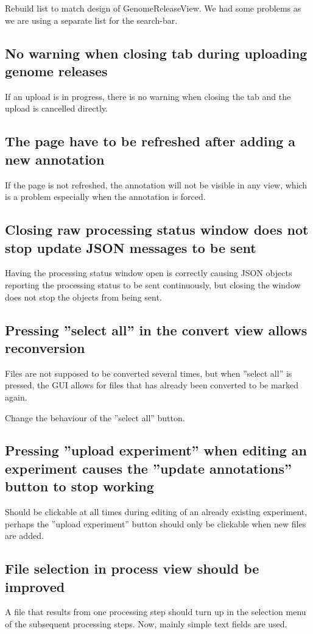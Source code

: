 Rebuild list to match design of GenomeReleaseView. We had some problems as we are using a separate list for the search-bar.

\subsection{No warning when closing tab during uploading genome releases}
If an upload is in progress, there is no warning when closing the tab and the upload is cancelled directly.

\subsection{The page have to be refreshed after adding a new annotation}
If the page is not refreshed, the annotation will not be visible in any view,
which is a problem especially when the annotation is forced.

\subsection{Closing raw processing status window does not stop update JSON messages to be sent}
Having the processing status window open is correctly causing JSON objects
reporting the processing status to be sent continuously, but closing the
window does not stop the objects from being sent. 

\subsection{Pressing ''select all'' in the convert view allows reconversion}
Files are not supposed to be converted several times, but when ''select all''
is pressed, the GUI allows for files that has already been converted to be
marked again.

Change the behaviour of the ''select all'' button.

\subsection{Pressing ''upload experiment'' when editing an experiment causes
the ''update annotations'' button to stop working}
Should be clickable at all times during editing of an already existing 
experiment, perhaps the ''upload experiment'' button should only be clickable
when new files are added.

\subsection{File selection in process view should be improved}
A file that results from one processing step should turn up in the selection
menu of the subsequent processing steps. Now, mainly simple text fields are used.

